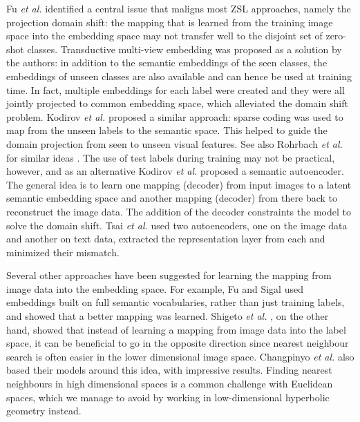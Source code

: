 \documentclass[12pt]{report}
\begin{document}
Fu \textit{et al.} \cite{Fu2015} identified a central issue that maligns most ZSL approaches, namely the projection domain shift: the mapping that is learned from the training image space into the embedding space may not transfer well to the disjoint set of zero-shot classes. Transductive multi-view embedding was proposed as a solution by the authors: in addition to the semantic embeddings of the seen classes, the embeddings of unseen classes are also available and can hence be used at training time. In fact, multiple embeddings for each label were created and they were all jointly projected to common embedding space, which alleviated the domain shift problem. Kodirov \textit{et al.} \cite{Kodirov2015} proposed a similar approach: sparse coding was used to map from the unseen labels to the semantic space. This helped to guide the domain projection from seen to unseen visual features. See also Rohrbach \textit{et al.} for similar ideas \cite{Rohrbach2013}. The use of test labels during training may not be practical, however, and as an alternative Kodirov \textit{et al.} \cite{Kodirov2017} proposed a semantic autoencoder. The general idea is to learn one mapping (decoder) from input images to a latent semantic embedding space and another mapping (decoder) from there back to reconstruct the image data. The addition of the decoder constraints the model to solve the domain shift. Tsai \textit{et al.} \cite{Tsai2016} used two autoencoders, one on the image data and another on text data, extracted the representation layer from each and minimized their mismatch. 

Several other approaches have been suggested for learning the mapping from image data into the embedding space. For example, Fu and Sigal \cite{Fu2016} used embeddings built on full semantic vocabularies, rather than just training labels, and showed that a better mapping was learned. Shigeto \textit{et al.} \cite{Shigeto2015}, on the other hand, showed that instead of learning a mapping from image data into the label space, it can be beneficial to go in the opposite direction since nearest neighbour search is often easier in the lower dimensional image space. Changpinyo \textit{et al.} \cite{Changpinyo2017} also based their models around this idea, with impressive results. Finding nearest neighbours in high dimensional spaces is a common challenge with Euclidean spaces, which we manage to avoid by working in low-dimensional hyperbolic geometry instead.
\end{document}

